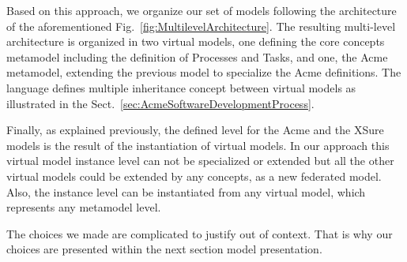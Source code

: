 Based on this approach, we organize our set of models following the
architecture of the aforementioned Fig.~\ref{fig:MultilevelArchitecture}. The
resulting multi-level architecture is organized in two virtual models, one
defining the core concepts metamodel including the definition of Processes and
Tasks, and one, the Acme metamodel, extending the previous model to specialize
the Acme definitions. The \FML language defines multiple inheritance concept
between virtual models as illustrated in the Sect.~\ref{sec:AcmeSoftwareDevelopmentProcess}.

Finally, as explained previously, the defined level for the Acme  and the XSure models is the result of the instantiation of virtual models. In our approach this virtual model instance level can not be specialized or extended but all the other virtual models could be extended by any concepts, as a new federated model.
Also, the instance level can be instantiated from any virtual model, which represents any metamodel level.




The choices we made are complicated to justify out of context. That is why our choices are presented within the next section model presentation.



